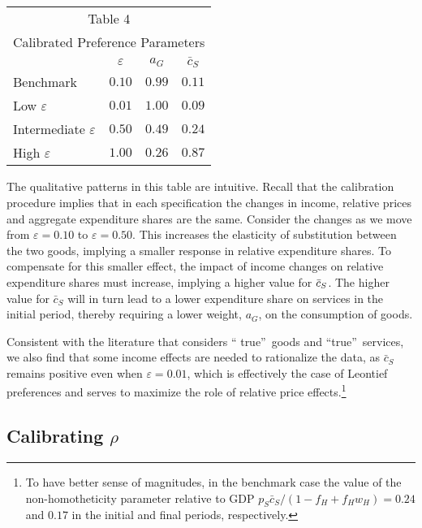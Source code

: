 \documentclass[12pt,english]{article}
\begin{document}
\begin{center}
{\normalsize {\small 
\begin{tabular}{lccc}
\multicolumn{4}{c}{Table 4} \\ 
\multicolumn{4}{c}{Calibrated Preference Parameters} \\ \hline
& $\varepsilon $ & $a_{G}$ & $\bar{c}_{S}$ \\ \hline
Benchmark & $0.10$ & $0.99$ & $0.11$ \\ 
Low $\varepsilon $ & $0.01$ & $1.00$ & $0.09$ \\ 
Intermediate $\varepsilon $ & $0.50$ & $0.49$ & $0.24$ \\ 
High $\varepsilon $ & $1.00$ & $0.26$ & $0.87$ \\ \hline
\end{tabular}
} }
\end{center}

{\normalsize The qualitative patterns in this table are intuitive. Recall
that the calibration procedure implies that in each specification the
changes in income, relative prices and aggregate expenditure shares are the
same. Consider the changes as we move from $\varepsilon =0.10$ to $%
\varepsilon =0.50$. This increases the elasticity of substitution between
the two goods, implying a smaller response in relative expenditure shares.
To compensate for this smaller effect, the impact of income changes on
relative expenditure shares must increase, implying a higher value for $\bar{%
c}_{S}$. The higher value for $\bar{c}_{S}$ will in turn lead to a lower
expenditure share on services in the initial period, thereby requiring a
lower weight, $a_{G}$, on the consumption of goods. }

{\normalsize Consistent with the literature that considers \textquotedblleft
true\textquotedblright\ goods and \textquotedblleft true\textquotedblright\
services, we also find that some income effects are needed to rationalize
the data, as $\bar{c}_{S}$ remains positive even when $\varepsilon =0.01$,
which is effectively the case of Leontief preferences and serves to maximize
the role of relative price effects.\footnote{%
To have better sense of magnitudes, in the benchmark case the value of the
non-homotheticity parameter relative to GDP $p_{S}\bar{c}%
_{S}/(1-f_{H}+f_{H}w_{H})=0.24$ and $0.17$ in the initial and final periods,
respectively.} }

\subsection{Calibrating $\rho $}
\end{document}
